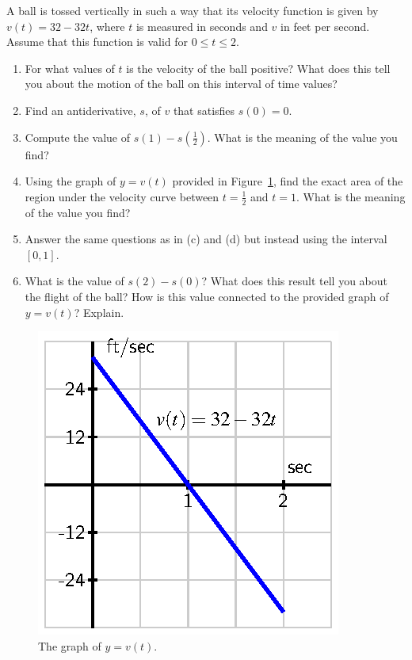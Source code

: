 \begin{activity} \label{A:4.1.2}  A ball is tossed vertically in such a way that its velocity function is given by $v(t) = 32 - 32t$, where $t$ is measured in seconds and $v$ in feet per second.  Assume that this function is valid for $0 \le t \le 2$.
\begin{enumerate}
	\item For what values of $t$ is the velocity of the ball positive?  What does this tell you about the motion of the ball on this interval of time values?
	\item Find an antiderivative, $s$, of $v$ that satisfies $s(0) = 0$.  
	\item Compute the value of $s(1) - s(\frac{1}{2})$.  What is the meaning of the value you find?
	\item Using the graph of $y = v(t)$ provided in Figure~\ref{F:4.1.Act2}, find the exact area of the region under the velocity curve between $t = \frac{1}{2}$ and $t = 1$.  What is the meaning of the value you find?
	\item Answer the same questions as in (c) and (d) but instead using the interval $[0,1]$.
	\item What is the value of $s(2) - s(0)$?  What does this result tell you about the flight of the ball?  How is this value connected to the provided graph of $y = v(t)$?  Explain.
\end{enumerate}
\begin{figure}[h]
\begin{center}
\includegraphics{figures/4_1_Act2.eps}
\end{center}
\caption{The graph of $y = v(t)$.} \label{F:4.1.Act2}
\end{figure}
\end{activity}
